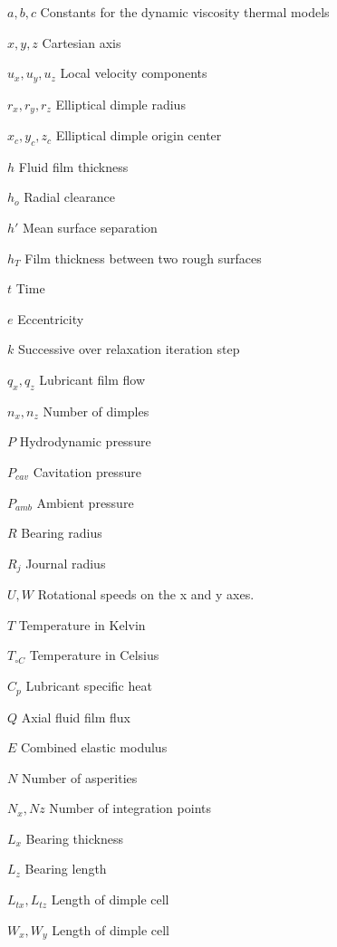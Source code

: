 \begin{simbolos}
	\item[$ a, b, c $] Constants for the dynamic viscosity thermal models
	\item[$ x, y, z $] Cartesian axis
	\item[$ u_x, u_y, u_z $] Local velocity components
	\item[$ r_x, r_y, r_z $] Elliptical dimple radius
	\item[$ x_c, y_c, z_c $] Elliptical dimple origin center
	\item[$ h $] Fluid film thickness
	\item[$ h_o $] Radial clearance
	\item[$ h' $] Mean surface separation
	\item[$ h_T $] Film thickness between two rough surfaces
	\item[$ t $] Time
	\item[$ e $] Eccentricity
	\item[$ k $] Successive over relaxation iteration step		
	\item[$ q_x, q_z $] Lubricant film flow	
	\item[$ n_x, n_z $] Number of dimples
	\item[$ P $] Hydrodynamic pressure
	\item[$ P_{cav} $] Cavitation pressure
	\item[$ P_{amb} $] Ambient pressure	
	\item[$ R $] Bearing radius
	\item[$ R_j $] Journal radius
	\item[$ U, W $] Rotational speeds on the x and y axes.
	\item[$ T $] Temperature in Kelvin
	\item[$ T_{\circ C} $] Temperature in Celsius
	\item[$ C_p $] Lubricant specific heat
	\item[$ Q $] Axial fluid film flux
	\item[$ E $] Combined elastic modulus
	\item[$ N $] Number of asperities
	\item[$ N_x, Nz $] Number of integration points
	\item[$ L_x $] Bearing thickness
	\item[$ L_z $] Bearing length
	\item[$ L_{tx}, L_{tz} $] Length of dimple cell	
	\item[$ W_x, W_y $] Length of dimple cell	

\end{simbolos}
